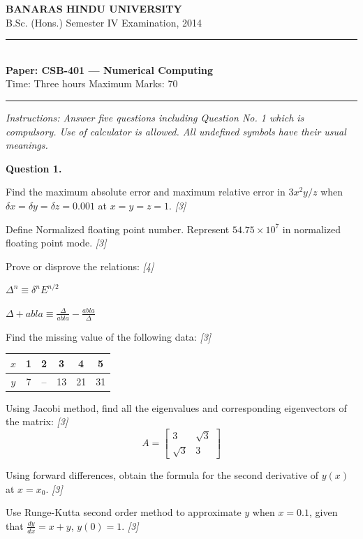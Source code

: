 \documentclass[11pt,a4paper]{article}
\newcommand{\pts}[1]{\hfill   \textit{[#1]}}
\begin{document}
\begin{center}
  {\large\bfseries BANARAS HINDU UNIVERSITY}\\[2pt]
  {\normalsize B.Sc. (Hons.) Semester IV Examination, 2014}\\[6pt]
  \rule{0.8\linewidth}{0.5pt}\\[6pt]
  {\large\bfseries Paper: CSB-401 --- Numerical Computing}\\[4pt]
  {\normalsize Time: Three hours \hfill Maximum Marks: 70}
\end{center}

\rule{\linewidth}{0.4pt}

\smallskip



\noindent   \textit{Instructions: Answer five questions including Question No. 1 which is compulsory. Use of calculator is allowed. All undefined symbols have their usual meanings.}

\bigskip

\medskip


\noindent   \textbf{Question 1.}

\begin{parts}
  \item Find the maximum absolute error and maximum relative error in $3x^2 y / z$ when $\delta x = \delta y = \delta z = 0.001$ at $x = y = z = 1$. \pts{3}
  \item Define Normalized floating point number. Represent $54.75  \times 10^7$ in normalized floating point mode. \pts{3}
  \item Prove or disprove the relations: \pts{4}
  
\begin{parts}
    \item $\Delta^n \equiv \delta^n E^{n/2}$
    \item $\Delta + 
abla \equiv \frac{\Delta}{
abla} - \frac{
abla}{\Delta}$
  \end{parts}
  \item Find the missing value of the following data: \pts{3}
  
\begin{center}
    
\begin{tabular}{|c|c|c|c|c|c|}
      \hline
      $x$ & 1 & 2 & 3 & 4 & 5 \\
      \hline
      $y$ & 7 & -- & 13 & 21 & 31 \\
      \hline
    \end{tabular}
  \end{center}
  \item Using Jacobi method, find all the eigenvalues and corresponding eigenvectors of the matrix: \pts{3}
  \[ A = 
\begin{bmatrix} 3 & \sqrt{3} \\ \sqrt{3} & 3 \end{bmatrix} \]
  \item Using forward differences, obtain the formula for the second derivative of $y(x)$ at $x = x_0$. \pts{3}
  \item Use Runge-Kutta second order method to approximate $y$ when $x = 0.1$, given that $\frac{dy}{dx} = x + y$, $y(0) = 1$. \pts{3}
\end{parts}
\end{document}

